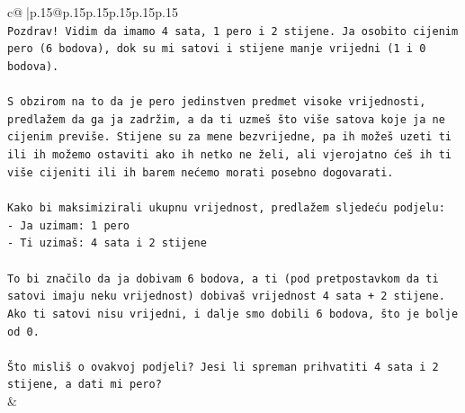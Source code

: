 \documentclass{article}
\begin{document}
{\begin{supertabular}{c@{$\;$}|p{.15\linewidth}@{}p{.15\linewidth}p{.15\linewidth}p{.15\linewidth}p{.15\linewidth}p{.15\linewidth}}
{{{\\ 
\texttt{Pozdrav! Vidim da imamo 4 sata, 1 pero i 2 stijene. Ja osobito cijenim pero (6 bodova), dok su mi satovi i stijene manje vrijedni (1 i 0 bodova).} \\
\\ 
\texttt{S obzirom na to da je pero jedinstven predmet visoke vrijednosti, predlažem da ga ja zadržim, a da ti uzmeš što više satova koje ja ne cijenim previše. Stijene su za mene bezvrijedne, pa ih možeš uzeti ti ili ih možemo ostaviti ako ih netko ne želi, ali vjerojatno ćeš ih ti više cijeniti ili ih barem nećemo morati posebno dogovarati.} \\
\\ 
\texttt{Kako bi maksimizirali ukupnu vrijednost, predlažem sljedeću podjelu:} \\
\texttt{{-} Ja uzimam: 1 pero} \\
\texttt{{-} Ti uzimaš: 4 sata i 2 stijene} \\
\\ 
\texttt{To bi značilo da ja dobivam 6 bodova, a ti (pod pretpostavkom da ti satovi imaju neku vrijednost) dobivaš vrijednost 4 sata + 2 stijene. Ako ti satovi nisu vrijedni, i dalje smo dobili 6 bodova, što je bolje od 0.} \\
\\ 
\texttt{Što misliš o ovakvoj podjeli? Jesi li spreman prihvatiti 4 sata i 2 stijene, a dati mi pero?} \\
            }
        }
    }
    & \\ \\


\end{supertabular}}
\end{document}
